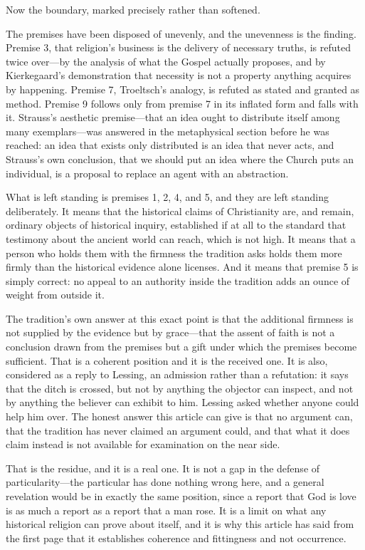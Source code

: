 Now the boundary, marked precisely rather than softened.

The premises have been disposed of unevenly, and the unevenness is the finding. Premise 3, that religion's business is the delivery of necessary truths, is refuted twice over---by the analysis of what the Gospel actually proposes, and by Kierkegaard's demonstration that necessity is not a property anything acquires by happening. Premise 7, Troeltsch's analogy, is refuted as stated and granted as method. Premise 9 follows only from premise 7 in its inflated form and falls with it. Strauss's aesthetic premise---that an idea ought to distribute itself among many exemplars---was answered in the metaphysical section before he was reached: an idea that exists only distributed is an idea that never acts, and Strauss's own conclusion, that we should put an idea where the Church puts an individual, is a proposal to replace an agent with an abstraction.

What is left standing is premises 1, 2, 4, and 5, and they are left standing deliberately. It means that the historical claims of Christianity are, and remain, ordinary objects of historical inquiry, established if at all to the standard that testimony about the ancient world can reach, which is not high. It means that a person who holds them with the firmness the tradition asks holds them more firmly than the historical evidence alone licenses. And it means that premise 5 is simply correct: no appeal to an authority inside the tradition adds an ounce of weight from outside it.

The tradition's own answer at this exact point is that the additional firmness is not supplied by the evidence but by grace---that the assent of faith is not a conclusion drawn from the premises but a gift under which the premises become sufficient. That is a coherent position and it is the received one. It is also, considered as a reply to Lessing, an admission rather than a refutation: it says that the ditch is crossed, but not by anything the objector can inspect, and not by anything the believer can exhibit to him. Lessing asked whether anyone could help him over. The honest answer this article can give is that no argument can, that the tradition has never claimed an argument could, and that what it does claim instead is not available for examination on the near side.

That is the residue, and it is a real one. It is not a gap in the defense of particularity---the particular has done nothing wrong here, and a general revelation would be in exactly the same position, since a report that God is love is as much a report as a report that a man rose. It is a limit on what any historical religion can prove about itself, and it is why this article has said from the first page that it establishes coherence and fittingness and not occurrence.

